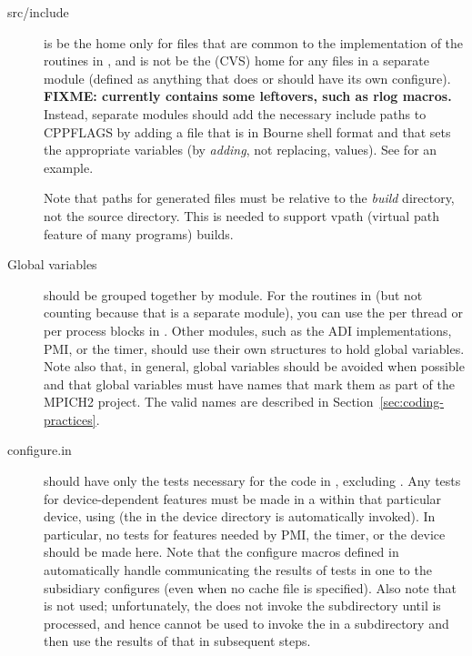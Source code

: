 \documentclass{article}
\def\fixme#1{\marginpar{FIXME:}\textbf{FIXME: #1}}
\begin{document}
\begin{description}
\item[src/include] is be the home only for files that are
  common to 
the implementation of the routines in , and is not be
the 
(CVS) home for any files in a separate module (defined as anything that does
or should have its own configure).  \fixme{currently contains some
  leftovers, such as rlog macros.}
Instead, separate modules should add the necessary include paths to
CPPFLAGS by adding a  file that is in Bourne shell
format and that sets the appropriate variables (by \emph{adding}, not
replacing, values).
See  for an
example. 

Note that paths for generated files must be relative to the \emph{build}
directory, not the source directory.  This is needed to support
vpath (virtual path feature of many  programs) builds.

\item[Global variables] should be grouped together by module.  For the routines
in  (but not counting  because that is
a separate 
module), you can use the per thread or per process blocks in
.  Other modules, such as the ADI implementations,
PMI, 
or the timer, should use their own structures to hold global
variables. 
Note also that, in general, global variables should be avoided when
possible and that global variables must have names that mark them as
part of the MPICH2 project.  The valid names are described in
Section~\ref{sec:coding-practices}. 

\item[configure.in] should have only the tests necessary for the
  code in 
, excluding  .  Any tests for
device-dependent features 
must be made in a  within that particular device, using
 (the  in the
  device directory 
is automatically invoked).  In particular, no tests for features needed by
PMI, the 
timer, or the device should be made here.  Note that the configure
macros defined in  automatically handle communicating the
results of tests in one  to the subsidiary configures
(even when no cache file is specified).  Also note that
   is not used; unfortunately, the
   does not invoke the subdirectory
   until  is processed, and hence
  cannot be used to invoke the  in a subdirectory and
  then use the results of that  in subsequent steps.


\end{description}
\end{document}
